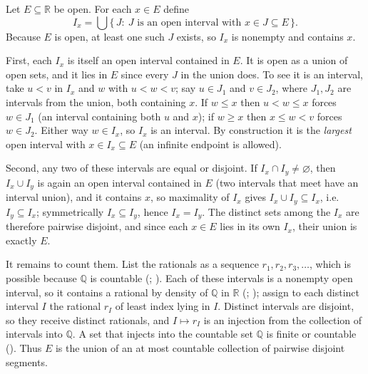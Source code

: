 \documentclass[main.tex]{subfiles}
\begin{document}
\begin{Solution}
Let $E\subseteq\mathbb R$ be open. For each $x\in E$ define
\[
  I_x=\bigcup\{\,J:\ J\text{ is an open interval with }x\in J\subseteq E\,\}.
\]
Because $E$ is open, at least one such $J$ exists, so $I_x$ is nonempty and contains $x$.

First, each $I_x$ is itself an open interval contained in $E$. It is open as a union of open sets, and
it lies in $E$ since every $J$ in the union does. To see it is an interval, take $u<v$ in $I_x$ and $w$
with $u<w<v$; say $u\in J_1$ and $v\in J_2$, where $J_1,J_2$ are intervals from the union, both
containing $x$. If $w\le x$ then $u<w\le x$ forces $w\in J_1$ (an interval containing both $u$ and $x$);
if $w\ge x$ then $x\le w<v$ forces $w\in J_2$. Either way $w\in I_x$, so $I_x$ is an interval. By
construction it is the \emph{largest} open interval with $x\in I_x\subseteq E$ (an infinite endpoint is
allowed).

Second, any two of these intervals are equal or disjoint. If $I_x\cap I_y\neq\varnothing$, then
$I_x\cup I_y$ is again an open interval contained in $E$ (two intervals that meet have an interval union),
and it contains $x$, so maximality of $I_x$ gives $I_x\cup I_y\subseteq I_x$, i.e.\ $I_y\subseteq I_x$;
symmetrically $I_x\subseteq I_y$, hence $I_x=I_y$. The distinct sets among the $I_x$ are therefore
pairwise disjoint, and since each $x\in E$ lies in its own $I_x$, their union is exactly $E$.

It remains to count them. List the rationals as a sequence $r_1,r_2,r_3,\dots$, which is possible because
$\mathbb Q$ is countable (; ). Each of these intervals
is a nonempty open interval, so it contains a rational by density of $\mathbb Q$ in $\mathbb R$
(; ); assign to each distinct interval $I$ the rational
$r_I$ of least index lying in $I$. Distinct intervals are disjoint, so they receive distinct rationals,
and $I\mapsto r_I$ is an injection from the collection of intervals into $\mathbb Q$. A set that injects
into the countable set $\mathbb Q$ is finite or countable (). Thus $E$ is the union of an at most countable collection of
pairwise disjoint segments.
\end{Solution}
\end{document}
